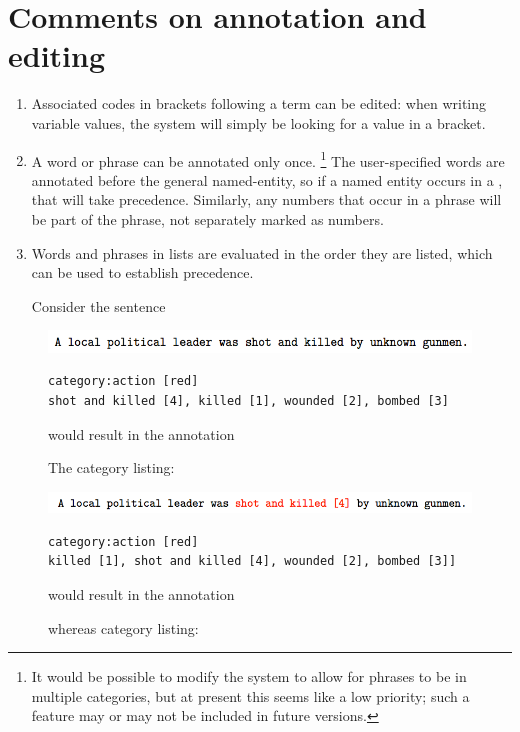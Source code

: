 \documentclass[letterpaper,10pt,english]{sphinxmanual}
\begin{document}
\section{Comments on annotation and editing}
\label{annotation:comments-on-annotation-and-editing}\begin{enumerate}
\item {} 
Associated codes in brackets following a term can be edited: when
writing variable values, the system will simply be looking for a
value in a bracket.

\item {} 
A word or phrase can be annotated only once. \footnote{
It would be possible to modify the system to allow for phrases to be
in multiple categories, but at present this seems like a low
priority; such a feature may or may not be included in future
versions.
} The user-specified
 words are annotated before the general named-entity, so
if a named entity occurs in a , that will take
precedence. Similarly, any numbers that occur in a 
phrase will be part of the phrase, not separately marked as numbers.

\item {} 
Words and phrases in  lists are evaluated in the order
they are listed, which can be used to establish precedence.

Consider the sentence

\end{enumerate}
\begin{figure}[htbp]
\centering
\capstart

\includegraphics{annotation0.png}
\caption{The category listing:}{\small 
\begin{Verbatim}[commandchars=\\\{\}]
category:action [red]
shot and killed [4], killed [1], wounded [2], bombed [3]
\end{Verbatim}

would result in the annotation
}\end{figure}
\begin{figure}[htbp]
\centering
\capstart

\includegraphics{annotation1.png}
\caption{whereas category listing:}{\small 
\begin{Verbatim}[commandchars=\\\{\}]
category:action [red]
killed [1], shot and killed [4], wounded [2], bombed [3]]
\end{Verbatim}

would result in the annotation
}\end{figure}
\end{document}
